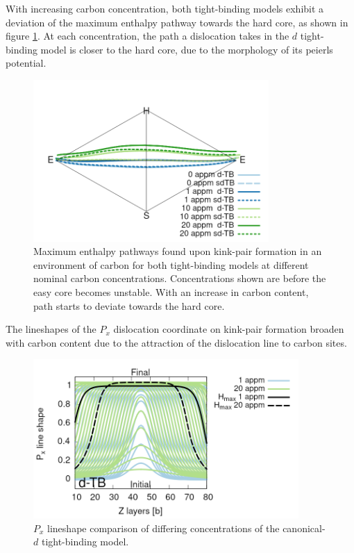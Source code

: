 \documentclass[a4paper,12pt,oneside,print,numbered,index,PageStyleIII]{PhDThesisPSnPDF}
\begin{document}
\begin{enumerate}
With increasing carbon concentration, both tight-binding models exhibit a
deviation of the maximum enthalpy pathway towards the hard core, as shown in figure
\ref{fig:kpequibpath}. At each concentration, the path a dislocation takes in the \(d\)
tight-binding model is closer to the hard core, due to the morphology of its
peierls potential.


\begin{figure}[htbp]
\centering
\includegraphics[width=0.8\textwidth]{iron/Images/pathway_equilibrium_sdTB_dTB_20appm_all.png}
\caption{Maximum enthalpy pathways found upon kink-pair formation in an environment of carbon for both tight-binding models at different nominal carbon concentrations. Concentrations shown are before the easy core becomes unstable. With an increase in carbon content, path starts to deviate towards the hard core. \label{fig:kpequibpath}}
\end{figure}

The lineshapes of the \(P_x\) dislocation coordinate on kink-pair formation broaden with carbon
content due to the attraction of the dislocation line to carbon sites.

\begin{figure}[htbp]
\centering
\includegraphics[width=0.9\textwidth]{iron/Images/lineshapes_dtb_moving_sites_labelled18.png}
\caption{\(P_x\) lineshape comparison of differing concentrations of the canonical-\(d\) tight-binding model.}
\end{figure}



\end{enumerate}
\end{document}
